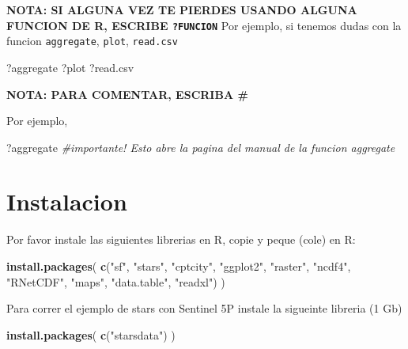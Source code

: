 \documentclass[]{book}
\newenvironment{Shaded}{\begin{snugshade}}{\end{snugshade}}
\newcommand{\CommentTok}[1]{\textcolor[rgb]{0.56,0.35,0.01}{\textit{#1}}}
\newcommand{\KeywordTok}[1]{\textcolor[rgb]{0.13,0.29,0.53}{\textbf{#1}}}
\newcommand{\NormalTok}[1]{#1}
\newcommand{\StringTok}[1]{\textcolor[rgb]{0.31,0.60,0.02}{#1}}
\begin{document}
\textbf{NOTA: SI ALGUNA VEZ TE PIERDES USANDO ALGUNA FUNCION DE R, ESCRIBE \texttt{?FUNCION}}
Por ejemplo, si tenemos dudas con la funcion \texttt{aggregate}, \texttt{plot}, \texttt{read.csv}

\begin{Shaded}
\begin{Highlighting}[]
\NormalTok{?aggregate}
\NormalTok{?plot}
\NormalTok{?read.csv}
\end{Highlighting}
\end{Shaded}

\textbf{NOTA: PARA COMENTAR, ESCRIBA \#}

Por ejemplo,

\begin{Shaded}
\begin{Highlighting}[]
\NormalTok{?aggregate }\CommentTok{#importante! Esto abre la pagina del manual de la funcion aggregate}
\end{Highlighting}
\end{Shaded}

\hypertarget{instalacion}{%
\section{Instalacion}\label{instalacion}}

Por favor instale las siguientes librerias en R, copie y peque (cole) en R:

\begin{Shaded}
\begin{Highlighting}[]
\KeywordTok{install.packages}\NormalTok{(}
  \KeywordTok{c}\NormalTok{(}\StringTok{"sf"}\NormalTok{, }\StringTok{"stars"}\NormalTok{, }\StringTok{"cptcity"}\NormalTok{, }\StringTok{"ggplot2"}\NormalTok{, }\StringTok{"raster"}\NormalTok{, }\StringTok{"ncdf4"}\NormalTok{, }
    \StringTok{"RNetCDF"}\NormalTok{, }\StringTok{"maps"}\NormalTok{, }\StringTok{"data.table"}\NormalTok{, }\StringTok{"readxl"}\NormalTok{)}
\NormalTok{)}
\end{Highlighting}
\end{Shaded}

Para correr el ejemplo de stars con Sentinel 5P instale la sigueinte libreria (1 Gb)

\begin{Shaded}
\begin{Highlighting}[]
\KeywordTok{install.packages}\NormalTok{(}
  \KeywordTok{c}\NormalTok{(}\StringTok{"starsdata"}\NormalTok{)}
\NormalTok{)}
\end{Highlighting}
\end{Shaded}
\end{document}
